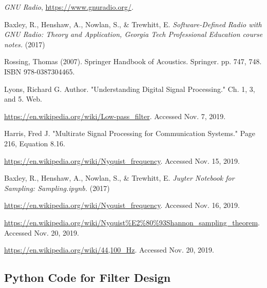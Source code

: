 \begin{thebibliography}{1}

\emph{GNU Radio}, \url{https://www.gnuradio.org/}.

Baxley, R., Henshaw, A., Nowlan, S., \& Trewhitt, E. \emph{Software-Defined Radio with GNU Radio: Theory and Application, Georgia Tech Professional Education course notes.} (2017)

Rossing, Thomas (2007). Springer Handbook of Acoustics. Springer. pp. 747, 748. ISBN 978-0387304465.

Lyons, Richard G. Author. "Understanding Digital Signal Processing."  Ch. 1, 3, and 5. Web.

\url{https://en.wikipedia.org/wiki/Low-pass_filter}.  Accessed Nov. 7, 2019.

Harris, Fred J. "Multirate Signal Processing for Communication Systems." Page 216, Equation 8.16.

\url{https://en.wikipedia.org/wiki/Nyquist_frequency}.  Accessed Nov. 15, 2019.

Baxley, R., Henshaw, A., Nowlan, S., \& Trewhitt, E. \emph{Juyter Notebook for Sampling: Sampling.ipynb.} (2017)

\url{https://en.wikipedia.org/wiki/Nyquist_frequency}.  Accessed Nov. 16, 2019.

\url{https://en.wikipedia.org/wiki/Nyquist\%E2\%80\%93Shannon_sampling_theorem}.  Accessed Nov. 20, 2019.

\url{https://en.wikipedia.org/wiki/44,100_Hz}. Accessed Nov. 20, 2019.

\end{thebibliography}


\newpage


\onecolumn
\appendix 

\subsection{Python Code for Filter Design\cite{notes:class}}






